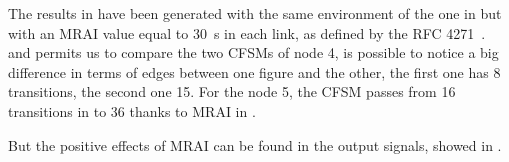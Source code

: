 The results in  have been generated with the same
environment of the one in  but with an \ac{MRAI} value
equal to \SI{30}{\second} in each link, as defined by the \ac{RFC} \num{4271}~\cite{rfc4271}.
 and  permits us to compare the two
\ac{CFSM}s of node \num{4}, is possible to notice a big difference in terms of edges
between one figure and the other, the first one has \num{8} transitions, the
second one \num{15}.
For the node \num{5}, the \ac{CFSM} passes from \num{16} transitions in 
to \num{36} thanks to \ac{MRAI} in .

But the positive effects of \ac{MRAI} can be found in the output signals,
showed in .

